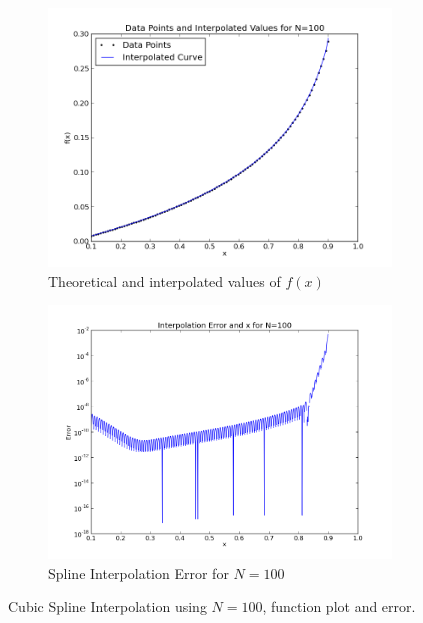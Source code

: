 \documentclass[11pt]{article}
\begin{document}
\begin{figure}
        \centering
        \begin{subfigure}{.5\textwidth}
  \centering
        \includegraphics[width=\linewidth]{q4/func_low.png}
                \caption{Theoretical and interpolated values of $f(x)$}
                \label{fig:q4_1_func}
                \end{subfigure}%
\begin{subfigure}{.5\textwidth}
  \centering
        \includegraphics[width=\linewidth]{q4/err_low_2.png}
                \caption{Spline Interpolation Error for $N=100$}
                \label{fig:q4_1_err}
	\end{subfigure}
            
\caption{Cubic Spline Interpolation using $N=100$, function plot and error. }
\label{fig:q4_1}            
\end{figure}
\end{document}
